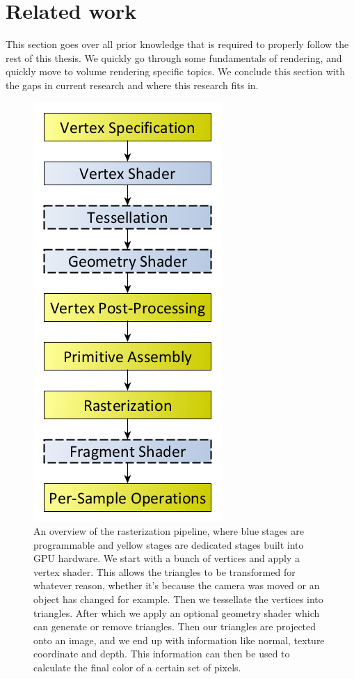 \section{Related work} \label{related_work}
This section goes over all prior knowledge that is required to properly follow the rest of this thesis. We quickly go through some fundamentals of rendering, and quickly move to volume rendering specific topics. We conclude this section with the gaps in current research and where this research fits in.



\begin{figure}
    \centering
    \includegraphics[width=0.5\linewidth]{figures/rasterization_pipeline.png}
    \caption{An overview of the rasterization pipeline, where blue stages are programmable and yellow stages are dedicated stages built into GPU hardware. We start with a bunch of vertices and apply a vertex shader. This allows the triangles to be transformed for whatever reason, whether it's because the camera was moved or an object has changed for example. Then we tessellate the vertices into triangles. After which we apply an optional geometry shader which can generate or remove triangles. Then our triangles are projected onto an image, and we end up with information like normal, texture coordinate and depth. This information can then be used to calculate the final color of a certain set of pixels. \cite{RasterPipeline}}
    \label{fig:rasterization_pipeline}
\end{figure}


